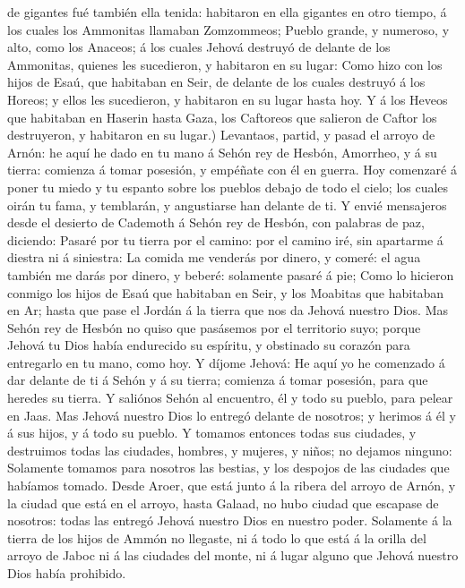 de gigantes fué también ella tenida: habitaron en ella gigantes en otro
tiempo, á los cuales los Ammonitas llamaban Zomzommeos; 
Pueblo grande, y numeroso, y alto, como los Anaceos; á los cuales Jehová
destruyó de delante de los Ammonitas, quienes les sucedieron, y
habitaron en su lugar:  Como hizo con los hijos de Esaú,
que habitaban en Seir, de delante de los cuales destruyó á los Horeos; y
ellos les sucedieron, y habitaron en su lugar hasta hoy.  Y
á los Heveos que habitaban en Haserin hasta Gaza, los Caftoreos que
salieron de Caftor los destruyeron, y habitaron en su lugar.)
 Levantaos, partid, y pasad el arroyo de Arnón: he aquí he
dado en tu mano á Sehón rey de Hesbón, Amorrheo, y á su tierra: comienza
á tomar posesión, y empéñate con él en guerra.  Hoy
comenzaré á poner tu miedo y tu espanto sobre los pueblos debajo de todo
el cielo; los cuales oirán tu fama, y temblarán, y angustiarse han
delante de ti.  Y envié mensajeros desde el desierto de
Cademoth á Sehón rey de Hesbón, con palabras de paz, diciendo:
 Pasaré por tu tierra por el camino: por el camino iré, sin
apartarme á diestra ni á siniestra:  La comida me venderás
por dinero, y comeré: el agua también me darás por dinero, y beberé:
solamente pasaré á pie;  Como lo hicieron conmigo los hijos
de Esaú que habitaban en Seir, y los Moabitas que habitaban en Ar; hasta
que pase el Jordán á la tierra que nos da Jehová nuestro Dios.
 Mas Sehón rey de Hesbón no quiso que pasásemos por el
territorio suyo; porque Jehová tu Dios había endurecido su espíritu, y
obstinado su corazón para entregarlo en tu mano, como hoy. 
Y díjome Jehová: He aquí yo he comenzado á dar delante de ti á Sehón y á
su tierra; comienza á tomar posesión, para que heredes su tierra.
 Y saliónos Sehón al encuentro, él y todo su pueblo, para
pelear en Jaas.  Mas Jehová nuestro Dios lo entregó delante
de nosotros; y herimos á él y á sus hijos, y á todo su pueblo.
 Y tomamos entonces todas sus ciudades, y destruimos todas
las ciudades, hombres, y mujeres, y niños; no dejamos ninguno:
 Solamente tomamos para nosotros las bestias, y los
despojos de las ciudades que habíamos tomado.  Desde Aroer,
que está junto á la ribera del arroyo de Arnón, y la ciudad que está en
el arroyo, hasta Galaad, no hubo ciudad que escapase de nosotros: todas
las entregó Jehová nuestro Dios en nuestro poder. 
Solamente á la tierra de los hijos de Ammón no llegaste, ni á todo lo
que está á la orilla del arroyo de Jaboc ni á las ciudades del monte, ni
á lugar alguno que Jehová nuestro Dios había prohibido.

